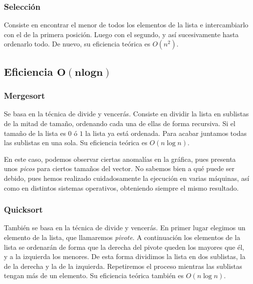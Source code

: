 \documentclass[11pt]{article}
\begin{document}
\subsubsection*{Selección}
Consiste en encontrar el menor de todos los elementos de la lista e intercambiarlo con el de la primera posición. Luego con el segundo, y así sucesivamente hasta ordenarlo todo. De nuevo, su eficiencia teórica es $O(n^2)$.
\begin{center}
	
\end{center}

\subsection*{Eficiencia $\boldsymbol{O(n log n)}$}
\subsubsection*{Mergesort}
Se basa en la técnica de divide y vencerás. Consiste en dividir la lista en sublistas de la mitad de tamaño, ordenando cada una de ellas de forma recursiva. Si el tamaño de la lista es $0$ ó $1$ la lista ya está ordenada. Para acabar juntamos todas las sublistas en una sola. Su eficiencia teórica es $O(n\log n)$.

\begin{center}
	
\end{center}

En este caso, podemos observar ciertas anomalías en la gráfica, pues presenta unos \textit{picos} para ciertos tamaños del vector. No sabemos bien a qué puede ser debido, pues hemos realizado cuidadosamente la ejecución en varias máquinas, así como en distintos sistemas operativos, obteniendo siempre el mismo resultado.

\subsubsection*{Quicksort}
También se basa en la técnica de divide y vencerás.
En primer lugar elegimos un elemento de la lista, que llamaremos \textit{pivote}. A continuación los elementos de la lista se ordenarán de forma que la derecha del pivote queden los mayores que él, y a la izquierda los menores. De esta forma dividimos la lista en dos sublistas, la de la derecha y la de la izquierda. Repetiremos el proceso mientras las sublistas tengan más de un elemento. Su eficiencia teórica también es $O(n\log n)$.
\end{document}
